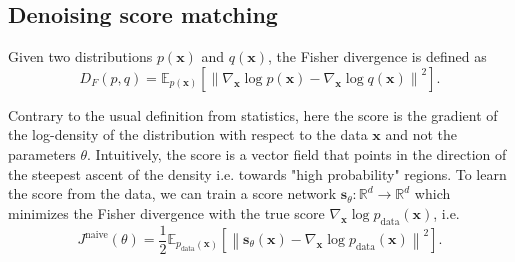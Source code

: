 \documentclass{article}
\begin{document}
\subsection{Denoising score matching}

Given two distributions $p(\mathbf{x})$ and $q(\mathbf{x})$, the Fisher divergence is defined as
\begin{equation}
    D_F(p, q) = \mathbb{E}_{p(\mathbf{x})} \left[ \left\| \nabla_\mathbf{x} \log p(\mathbf{x}) - \nabla_\mathbf{x} \log q(\mathbf{x}) \right\|^2 \right].
\end{equation}

Contrary to the usual definition from statistics, here the score is the gradient of the log-density of the distribution 
with respect to the data $\mathbf{x}$ and not the parameters $\theta$. Intuitively, the score is a vector field that points
in the direction of the steepest ascent of the density i.e. towards "high probability" regions. To learn the score from 
the data, we can train a score network $\mathbf{s}_\theta: \mathbb{R}^d \to \mathbb{R}^d$ which minimizes the Fisher 
divergence with the true score $\nabla_\mathbf{x} \log p_\text{data}(\mathbf{x})$, i.e.
\begin{equation}
    \label{eq:score-naive}
    J^\text{naive}(\theta) = \frac{1}{2}\mathbb{E}_{p_\text{data}(\mathbf{x})} \left[ \left\| \mathbf{s}_\theta(\mathbf{x}) - \nabla_\mathbf{x} \log p_\text{data}(\mathbf{x}) \right\|^2 \right].
\end{equation}
\end{document}
